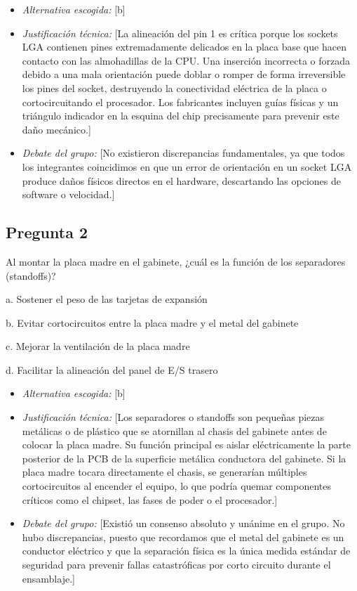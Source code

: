 \documentclass{article}
\begin{document}
\begin{itemize}
\item \emph{Alternativa escogida:} [b]

\item \emph{Justificación técnica:} [La alineación del pin 1 es crítica porque
los sockets LGA contienen pines extremadamente
delicados en la placa base que hacen contacto con las almohadillas
de la CPU. Una inserción incorrecta o forzada debido a una mala
orientación puede doblar o romper de forma irreversible los pines
del socket, destruyendo la conectividad eléctrica de la placa o
cortocircuitando el procesador. Los fabricantes incluyen guías
físicas y un triángulo indicador en la esquina del chip
precisamente para prevenir este daño mecánico.]

\item \emph{Debate del grupo:} [No existieron discrepancias fundamentales, ya
que todos los integrantes coincidimos en que un error de orientación
en un socket LGA produce daños físicos directos en el hardware,
descartando las opciones de software o velocidad.]
\end{itemize}

\subsection{Pregunta 2}
\label{sec:org26b32e9}
Al montar la placa madre en el gabinete, ¿cuál es la función de los separadores (standoffs)?

a. Sostener el peso de las tarjetas de expansión

b. Evitar cortocircuitos entre la placa madre y el metal del gabinete

c. Mejorar la ventilación de la placa madre

d. Facilitar la alineación del panel de E/S trasero

\begin{itemize}
\item \emph{Alternativa escogida:} [b]

\item \emph{Justificación técnica:} [Los separadores o standoffs son pequeñas
piezas metálicas o de plástico que se atornillan al chasis del
gabinete antes de colocar la placa madre. Su función principal es
aislar eléctricamente la parte posterior de la PCB de la
superficie metálica conductora del gabinete. Si la placa madre
tocara directamente el chasis, se generarían múltiples
cortocircuitos al encender el equipo, lo que podría quemar
componentes críticos como el chipset, las fases de poder o el
procesador.]

\item \emph{Debate del grupo:} [Existió un consenso absoluto y unánime en el
grupo. No hubo discrepancias, puesto que recordamos que el metal del
gabinete es un conductor eléctrico y que la separación física es la
única medida estándar de seguridad para prevenir fallas
catastróficas por corto circuito durante el ensamblaje.]
\end{itemize}
\end{document}
